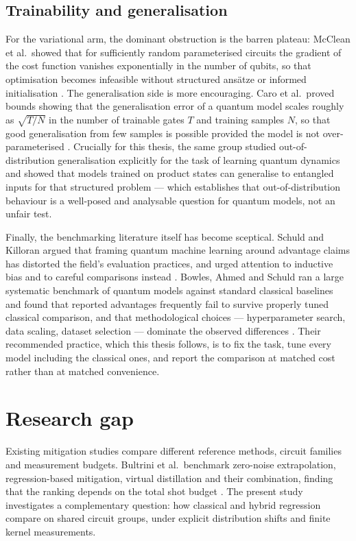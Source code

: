 \documentclass[Thesis.tex]{subfiles}
\begin{document}
\subsection{Trainability and generalisation}

For the variational arm, the dominant obstruction is the barren plateau:
McClean et al.\ showed that for sufficiently random parameterised circuits the
gradient of the cost function vanishes exponentially in the number of qubits,
so that optimisation becomes infeasible without structured ans\"atze or
informed initialisation \cite{mcclean2018barren}. The generalisation side is
more encouraging. Caro et al.\ proved bounds showing that the generalisation
error of a quantum model scales roughly as $\sqrt{T/N}$ in the number of
trainable gates $T$ and training samples $N$, so that good generalisation from
few samples is possible provided the model is not over-parameterised
\cite{caro2022generalization}. Crucially for this thesis, the same group
studied out-of-distribution generalisation explicitly for the task of learning
quantum dynamics and showed that models trained on product states can
generalise to entangled inputs for that structured problem
\cite{caro2023ood} --- which establishes that out-of-distribution behaviour is
a well-posed and analysable question for quantum models, not an unfair test.

Finally, the benchmarking literature itself has become sceptical. Schuld and
Killoran argued that framing quantum machine learning around advantage claims
has distorted the field's evaluation practices, and urged attention to
inductive bias and to careful comparisons instead \cite{schuld2022isquantum}.
Bowles, Ahmed and Schuld ran a large systematic benchmark of quantum models
against standard classical baselines and found that reported advantages
frequently fail to survive properly tuned classical comparison, and that
methodological choices --- hyperparameter search, data scaling, dataset
selection --- dominate the observed differences \cite{bowles2024better}. Their
recommended practice, which this thesis follows, is to fix the task, tune
every model including the classical ones, and report the comparison at matched
cost rather than at matched convenience.

\section{Research gap}\label{sec2:gap}

Existing mitigation studies compare different reference methods, circuit
families and measurement budgets. Bultrini et al.\ benchmark zero-noise
extrapolation, regression-based mitigation, virtual distillation and their
combination, finding that the ranking depends on the total shot budget
\cite{bultrini2023unifying}. The present study investigates a complementary
question: how classical and hybrid regression compare on shared circuit
groups, under explicit distribution shifts and finite kernel measurements.
\end{document}
